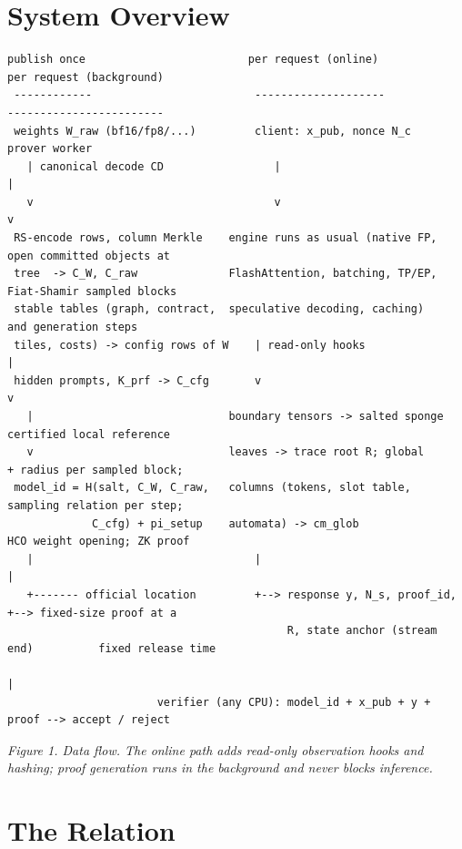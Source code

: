 \documentclass[10pt]{article}
\begin{document}
\section{System Overview}
\begin{center}
\begin{Verbatim}[fontsize=\fontsize{6.2}{7.2}\selectfont]
 publish once                         per request (online)                    per request (background)
 ------------                         --------------------                    ------------------------
 weights W_raw (bf16/fp8/...)         client: x_pub, nonce N_c                 prover worker
   | canonical decode CD                 |                                       |
   v                                     v                                       v
 RS-encode rows, column Merkle    engine runs as usual (native FP,       open committed objects at
 tree  -> C_W, C_raw              FlashAttention, batching, TP/EP,       Fiat-Shamir sampled blocks
 stable tables (graph, contract,  speculative decoding, caching)         and generation steps
 tiles, costs) -> config rows of W    | read-only hooks                     |
 hidden prompts, K_prf -> C_cfg       v                                     v
   |                              boundary tensors -> salted sponge      certified local reference
   v                              leaves -> trace root R; global         + radius per sampled block;
 model_id = H(salt, C_W, C_raw,   columns (tokens, slot table,           sampling relation per step;
             C_cfg) + pi_setup    automata) -> cm_glob                   HCO weight opening; ZK proof
   |                                  |                                     |
   +------- official location         +--> response y, N_s, proof_id,       +--> fixed-size proof at a
                                           R, state anchor (stream end)          fixed release time
                                                                                 |
                       verifier (any CPU): model_id + x_pub + y + proof --> accept / reject
\end{Verbatim}
\end{center}
\emph{Figure 1. Data flow. The online path adds read-only observation hooks and hashing; proof generation runs in the background and never blocks inference.}

\section{The Relation}
\end{document}
